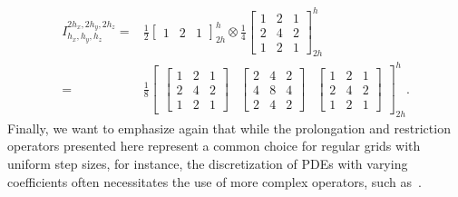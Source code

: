\begin{equation}
	\begin{split}
		I_{h_x, h_y, h_z}^{2h_x, 2h_y, 2h_z} = & \frac{1}{2} \begin{bmatrix}
			1 & 2 & 1
		\end{bmatrix}_{2h}^{h} \otimes 
		\frac{1}{4} 
		\begin{bmatrix}
			1 & 2 & 1 \\
			2 & 4 & 2 \\
			1 & 2 & 1
		\end{bmatrix}_{2h}^{h} \\
		= & \frac{1}{8} \begin{bmatrix}
			\begin{bmatrix}
				1 & 2 & 1 \\
				2 & 4 & 2 \\
				1 & 2 & 1
			\end{bmatrix}&	\begin{bmatrix}
				2 & 4 & 2 \\
				4 & 8 & 4 \\
				2 & 4 & 2
			\end{bmatrix} &
			\begin{bmatrix}
				1 & 2 & 1 \\
				2 & 4 & 2 \\
				1 & 2 & 1
			\end{bmatrix}
		\end{bmatrix}_{2h}^{h} .
	\end{split}
\end{equation}
Finally, we want to emphasize again that while the prolongation and restriction operators presented here represent a common choice for regular grids with uniform step sizes, for instance, the discretization of PDEs with varying coefficients often necessitates the use of more complex operators, such as~\cite{dendy1982black}.

